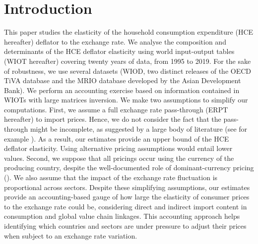 \documentclass[11pt,a4paper]{paper} %
\begin{document}
\section*{Introduction}
This paper studies the elasticity of the household consumption expenditure (HCE hereafter) deflator to the exchange rate. 
We analyse the composition and determinants of the HCE deflator elasticity using world input-output tables (WIOT hereafter) covering twenty years of data, from 1995 to 2019.
For the sake of robustness, we use several datasets (WIOD, two distinct releases of the OECD TiVA database and the MRIO database developed by the Asian Development Bank). 
We perform an accounting exercise based on information contained in WIOTs with large matrices inversion. 
We make two assumptions to simplify our computations. 
First, we assume a full exchange rate pass-through (ERPT hereafter) to import prices. 
Hence, we do not consider the fact that the pass-through might be incomplete, as suggested by a large body of literature (see for example \cite{Berman2012}).
As a result, our estimates provide an upper bound of the HCE deflator elasticity.
Using alternative pricing assumptions would entail lower values.
Second, we suppose that all pricings occur using the currency of the producing country, despite the well-documented role of dominant-currency pricing (\cite{Gopinath2020}).
We also assume that the impact of the exchange rate fluctuation is proportional across sectors.
Despite these simplifying assumptions, our estimates provide an accounting-based gauge of how large the elasticity of consumer prices to the exchange rate could be, considering direct and indirect import content in consumption and global value chain linkages. 
This accounting approach helps identifying which countries and sectors are under pressure to adjust their prices when subject to an exchange rate variation.  \\
\end{document}
